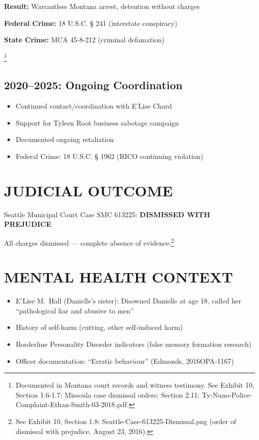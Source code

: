 \documentclass[12pt,oneside]{article}
\begin{document}
\textbf{Result:} Warrantless Montana arrest, detention without charges

\textbf{Federal Crime:} 18 U.S.C. § 241 (interstate conspiracy)

\textbf{State Crime:} MCA 45-8-212 (criminal defamation)

\footnote{Documented in Montana court records and witness testimony. See Exhibit 10, Section 1.6-1.7: Missoula case dismissal orders; Section 2.11: Ty-Nuno-Police-Complaint-Ethan-Smith-03-2018.pdf.}

\subsection*{2020--2025: Ongoing Coordination}

\begin{itemize}

\item Continued contact/coordination with E'Lise Chard

\item Support for Tyleen Root business sabotage campaign

\item Documented ongoing retaliation

\item Federal Crime: 18 U.S.C. § 1962 (RICO continuing violation)

\end{itemize}

\section*{JUDICIAL OUTCOME}

Seattle Municipal Court Case SMC 613225: \textbf{DISMISSED WITH PREJUDICE}

All charges dismissed --- complete absence of evidence.\footnote{See Exhibit 10, Section 1.8: Seattle-Case-613225-Dismissal.png (order of dismissal with prejudice, August 23, 2016).}

\section*{MENTAL HEALTH CONTEXT}

\begin{itemize}

\item E'Lise M.\ Hall (Danielle's sister): Disowned Danielle at age 18, called her ``pathological liar and abusive to men''

\item History of self-harm (cutting, other self-induced harm)

\item Borderline Personality Disorder indicators (false memory formation research)

\item Officer documentation: ``Erratic behaviour'' (Edmonds, 2016OPA-1167)

\end{itemize}
\end{document}
